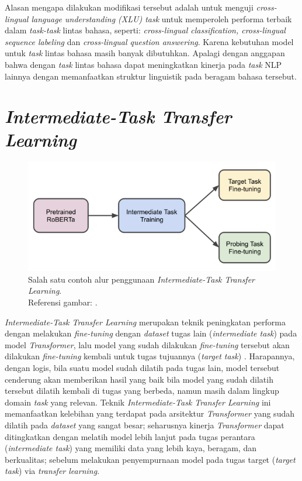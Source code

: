 Alasan mengapa dilakukan modifikasi tersebut adalah untuk menguji \emph{cross-lingual language understanding (XLU) task} untuk  memperoleh performa terbaik dalam \emph{task-task} lintas bahasa, seperti: \emph{cross-lingual classification, cross-lingual sequence labeling} dan \emph{cross-lingual question answering}. Karena kebutuhan model untuk \emph{task} lintas bahasa masih banyak dibutuhkan. Apalagi dengan anggapan bahwa dengan \emph{task} lintas bahasa dapat meningkatkan kinerja pada \emph{task} NLP lainnya dengan memanfaatkan struktur linguistik pada beragam bahasa tersebut.

\section{\emph{Intermediate-Task Transfer Learning}}

\begin{figure}[h]
\includegraphics[width=\linewidth]{assets/pics/ittl-pipeline.png}
\centering
\caption{Salah satu contoh alur penggunaan \emph{Intermediate-Task Transfer Learning}.\\\hspace{\textwidth}Referensi gambar: \citep{pruksachatkun-etal-2020-intermediate}.}
\end{figure}

\emph{Intermediate-Task Transfer Learning} merupakan teknik peningkatan performa dengan melakukan \emph{fine-tuning} dengan \emph{dataset} tugas lain (\emph{intermediate task}) pada model \emph{Transformer}, lalu model yang sudah dilakukan \emph{fine-tuning} tersebut akan dilakukan \emph{fine-tuning} kembali untuk tugas tujuannya (\emph{target task}) \citep{pruksachatkun-etal-2020-intermediate}. Harapannya, dengan logis, bila suatu model sudah dilatih pada tugas lain, model tersebut cenderung akan memberikan hasil yang baik bila model yang sudah dilatih tersebut dilatih kembali di tugas yang berbeda, namun masih dalam lingkup domain \emph{task} yang relevan. Teknik \emph{Intermediate-Task Transfer Learning} ini memanfaatkan kelebihan yang terdapat pada arsitektur \emph{Transformer} yang sudah dilatih pada \emph{dataset} yang sangat besar; seharusnya kinerja \emph{Transformer} dapat ditingkatkan dengan melatih model lebih lanjut pada tugas perantara (\emph{intermediate task}) yang memiliki data yang lebih kaya, beragam, dan berkualitas; sebelum melakukan penyempurnaan model pada tugas target (\emph{target task}) via \emph{transfer learning}. 

